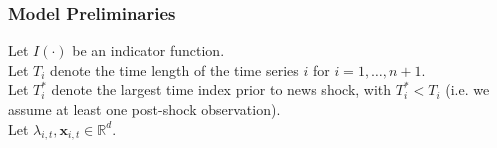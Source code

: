 \documentclass[9pt]{beamer}
\newcommand{\x}{\textbf{x}}
\theoremstyle{definition}
\begin{document}
        
    
    
        
    \begin{frame}
        \frametitle{Model Preliminaries}
    
        \fontsize{8}{7.2}
    
        Let $I(\cdot)$ be an indicator function.  \\
    \bigbreak
        Let $T_i$ denote the time length of the time series $i$ for $i = 1, \ldots, n+1$.\\
        \bigbreak
        Let $T_i^*$ denote the largest time index prior to news shock, with $T_i^* < T_i$ (i.e. we assume at least one post-shock observation). \\
        \bigbreak
        Let $\lambda_{i,t},  \x_{i,t} \in \mathbb{R}^{d}$.  
    \end{frame}
\end{document}
